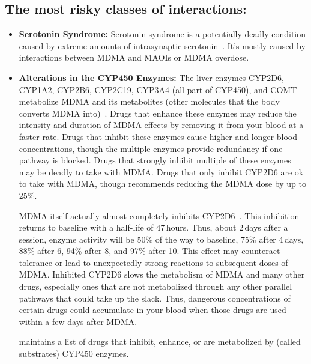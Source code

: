 \documentclass[11pt,oneside]{book}
\let\cite\parencite
\begin{document}
\subsection*{The most risky classes of interactions:}
\begin{itemize}
    \item \textbf{Serotonin Syndrome:} Serotonin syndrome is a potentially deadly condition caused by extreme amounts of intrasynaptic serotonin~\cite{malcolmSerotonin,sarparastDrugInteractions}. It's mostly caused by interactions between MDMA and MAOIs or MDMA overdose.
    \item \textbf{Alterations in the CYP450 Enzymes:} The liver enzymes CYP2D6, CYP1A2, CYP2B6, CYP2C19, CYP3A4 (all part of CYP450), and COMT metabolize MDMA and its metabolites (other molecules that the body converts MDMA into)~\cite{sarparastDrugInteractions}. Drugs that enhance these enzymes may reduce the intensity and duration of MDMA effects by removing it from your blood at a faster rate. Drugs that inhibit these enzymes cause higher and longer blood concentrations, though the multiple enzymes provide redundancy if one pathway is blocked. Drugs that strongly inhibit multiple of these enzymes may be deadly to take with MDMA. Drugs that only inhibit CYP2D6 are ok to take with MDMA, though \textcite{liechtiInteractions} recommends reducing the MDMA dose by up to 25\%.

    MDMA itself actually almost completely inhibits CYP2D6~\cite{omathunaCYP}. This inhibition returns to baseline with a half-life of 47\,hours. Thus, about 2\,days after a session, enzyme activity will be 50\% of the way to baseline, 75\% after 4\,days, 88\% after 6, 94\% after 8, and 97\% after 10. This effect may counteract tolerance or lead to unexpectedly strong reactions to subsequent doses of MDMA. Inhibited CYP2D6 slows the metabolism of MDMA and many other drugs, especially ones that are not metabolized through any other parallel pathways that could take up the slack. Thus, dangerous concentrations of certain drugs could accumulate in your blood when those drugs are used within a few days after MDMA.

    \textcite{flockartTable} maintains a list of drugs that inhibit, enhance, or are metabolized by (called substrates) CYP450 enzymes.
\end{itemize}
\end{document}
